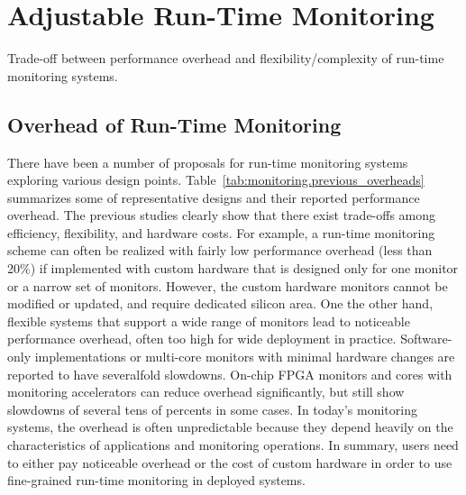 \section{Adjustable Run-Time Monitoring}
\label{sec:monitoring}

\begin{table*}[t]
  \begin{center}
    \vspace{-0.0in}
    \begin{footnotesize}
    
    \end{footnotesize}
    \caption{Trade-off between performance overhead and flexibility/complexity of run-time monitoring systems.}
    \vspace{-0.2in}
    \label{tab:monitoring.previous_overheads}
  \end{center}
\end{table*}

\subsection{Overhead of Run-Time Monitoring}

There have been a number of proposals for run-time monitoring systems exploring various
design points. %
Table~\ref{tab:monitoring.previous_overheads} summarizes some of representative designs
and their reported performance overhead. The previous studies clearly show that there
exist trade-offs among efficiency, flexibility, and hardware costs. 
For example, a run-time monitoring scheme can often be realized with fairly low
performance overhead (less than 20\%) if implemented with custom hardware that is
designed only for one monitor or a narrow set of monitors. However, the custom
hardware monitors cannot be modified or updated, and require dedicated silicon area. 
One the other hand, flexible systems that support a wide range of monitors lead 
to noticeable performance overhead, often too high for wide deployment in practice.
Software-only implementations \cite{FIXME} or multi-core monitors with minimal
hardware changes \cite{lba-asid06} are reported to have severalfold slowdowns.
On-chip FPGA monitors \cite{flexcore-micro10} and cores with monitoring accelerators
\cite{lba-isca08, fade-hpca14} can reduce overhead significantly, but still show
slowdowns of several tens of percents in some cases.
In today's monitoring systems, the overhead is often unpredictable because they
depend heavily on the characteristics of applications and monitoring operations.
In summary, users need to either pay noticeable overhead or the cost of custom
hardware in order to use fine-grained run-time monitoring in deployed systems.

